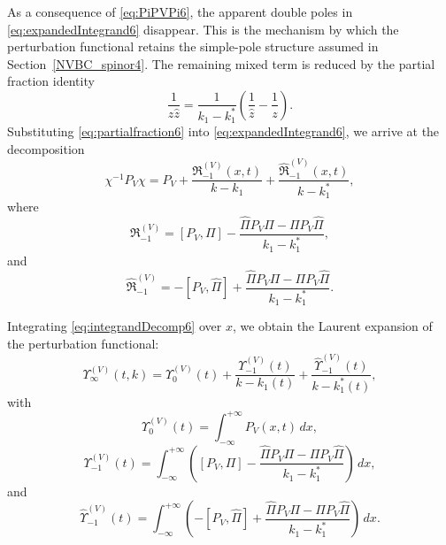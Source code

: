 \documentclass[11pt]{amsart}
\theoremstyle{definition}
\numberwithin{equation}{section}
\begin{document}
As a consequence of \eqref{eq:PiPVPi6}, the apparent double poles in \eqref{eq:expandedIntegrand6} disappear. This is the mechanism by which the perturbation functional retains the simple-pole structure assumed in Section~\ref{NVBC_spinor4}. The remaining mixed term is reduced by the partial fraction identity
\begin{equation}
\frac{1}{z\widehat z}
=
\frac{1}{k_1-k_1^*}
\left(
\frac{1}{\widehat z}-\frac{1}{z}
\right).
\label{eq:partialfraction6}
\end{equation}
Substituting \eqref{eq:partialfraction6} into \eqref{eq:expandedIntegrand6}, we arrive at the decomposition
\begin{equation}
\chi^{-1}P_V\chi
=
P_V
+\frac{\mathfrak R_{-1}^{(V)}(x,t)}{k-k_1}
+\frac{\widehat{\mathfrak R}_{-1}^{(V)}(x,t)}{k-k_1^*},
\label{eq:integrandDecomp6}
\end{equation}
where
\begin{equation}
\mathfrak R_{-1}^{(V)}
=
[P_V,\Pi]
-
\frac{\widehat\Pi P_V\Pi-\Pi P_V\widehat\Pi}{k_1-k_1^*},
\label{eq:Rminus1kernel6}
\end{equation}
and
\begin{equation}
\widehat{\mathfrak R}_{-1}^{(V)}
=
-[P_V,\widehat\Pi]
+
\frac{\widehat\Pi P_V\Pi-\Pi P_V\widehat\Pi}{k_1-k_1^*}.
\label{eq:Rhatminus1kernel6}
\end{equation}

Integrating \eqref{eq:integrandDecomp6} over $x$, we obtain the Laurent expansion of the perturbation functional:
\begin{equation}
\Upsilon_\infty^{(V)}(t,k)
=
\Upsilon_0^{(V)}(t)
+
\frac{\Upsilon_{-1}^{(V)}(t)}{k-k_1(t)}
+
\frac{\widehat\Upsilon_{-1}^{(V)}(t)}{k-k_1^*(t)},
\label{eq:UpsilonLaurent6}
\end{equation}
with
\begin{equation}
\Upsilon_0^{(V)}(t)=\int_{-\infty}^{+\infty} P_V(x,t)\,dx,
\label{eq:Upsilon0V6}
\end{equation}
\begin{equation}
\Upsilon_{-1}^{(V)}(t)
=
\int_{-\infty}^{+\infty}
\left(
[P_V,\Pi]
-
\frac{\widehat\Pi P_V\Pi-\Pi P_V\widehat\Pi}{k_1-k_1^*}
\right)\,dx,
\label{eq:UpsilonMinus1V6}
\end{equation}
and
\begin{equation}
\widehat\Upsilon_{-1}^{(V)}(t)
=
\int_{-\infty}^{+\infty}
\left(
-[P_V,\widehat\Pi]
+
\frac{\widehat\Pi P_V\Pi-\Pi P_V\widehat\Pi}{k_1-k_1^*}
\right)\,dx.
\label{eq:UpsilonHatMinus1V6}
\end{equation}
\end{document}

